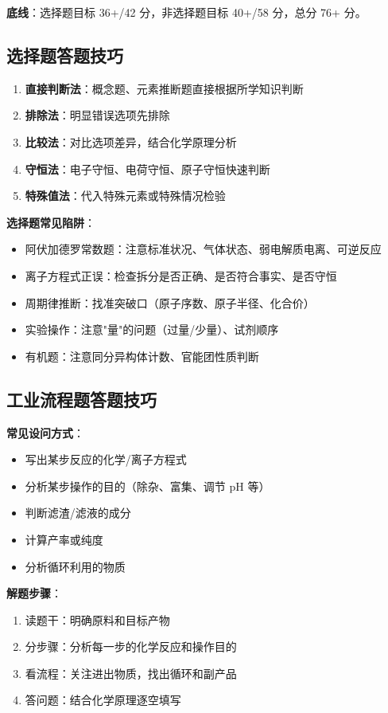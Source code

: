 \textbf{底线}：选择题目标 36+/42 分，非选择题目标 40+/58 分，总分 76+ 分。

\subsection{选择题答题技巧}

\begin{enumerate}
  \item \textbf{直接判断法}：概念题、元素推断题直接根据所学知识判断
  \item \textbf{排除法}：明显错误选项先排除
  \item \textbf{比较法}：对比选项差异，结合化学原理分析
  \item \textbf{守恒法}：电子守恒、电荷守恒、原子守恒快速判断
  \item \textbf{特殊值法}：代入特殊元素或特殊情况检验
\end{enumerate}

\textbf{选择题常见陷阱}：
\begin{itemize}
  \item 阿伏加德罗常数题：注意标准状况、气体状态、弱电解质电离、可逆反应
  \item 离子方程式正误：检查拆分是否正确、是否符合事实、是否守恒
  \item 周期律推断：找准突破口（原子序数、原子半径、化合价）
  \item 实验操作：注意"量"的问题（过量/少量）、试剂顺序
  \item 有机题：注意同分异构体计数、官能团性质判断
\end{itemize}

\subsection{工业流程题答题技巧}

\textbf{常见设问方式}：
\begin{itemize}
  \item 写出某步反应的化学/离子方程式
  \item 分析某步操作的目的（除杂、富集、调节 pH 等）
  \item 判断滤渣/滤液的成分
  \item 计算产率或纯度
  \item 分析循环利用的物质
\end{itemize}

\textbf{解题步骤}：
\begin{enumerate}
  \item 读题干：明确原料和目标产物
  \item 分步骤：分析每一步的化学反应和操作目的
  \item 看流程：关注进出物质，找出循环和副产品
  \item 答问题：结合化学原理逐空填写
\end{enumerate}

